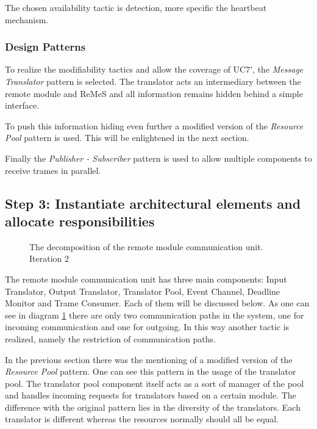 \npar The chosen availability tactic is detection, more specific the heartbeat
mechanism.

\subsubsection{Design Patterns}
\label{add:it2/patterns}

\npar To realize the modifiability tactics and allow the coverage of UC7', the
\emph{Message Translator} pattern is selected. The translator acts an
intermediary between the remote module and ReMeS and all information remains
hidden behind a simple interface. 

\npar To push this information hiding even further a modified version of the
\emph{Resource Pool} pattern is used. This will be enlightened in the next
section.

\npar Finally the \emph{Publisher - Subscriber} pattern is used to allow
multiple components to receive trames in parallel. 

\subsection{Step 3: Instantiate architectural elements and allocate responsibilities}
\label{add:it2/elements}

\begin{figure}[H]
	\begin{centering}
		\caption{The decomposition of the remote module communication unit. Iteration
		2}
		\label{fig:add/it2/decomposition}
	\end{centering}
\end{figure}

\npar The remote module communication unit has three main components: Input
Translator, Output Translator, Translator Pool, Event Channel, Deadline Monitor
and Trame Consumer. Each of them will be discussed below. As one can see in
diagram \ref{fig:add/it2/decomposition} there are only two communication paths
in the system, one for incoming communication and one for outgoing. In this way
another tactic is realized, namely the restriction of communication paths.

\npar In the previous section there was the mentioning of a modified version of
the \emph{Resource Pool} pattern. One can see this pattern in the usage of the
translator pool. The translator pool component itself acts as a sort of manager
of the pool and handles incoming requests for translators based on a
certain module. The difference with the original pattern lies in the 
diversity of the translators. Each translator is different whereas the
resources normally should all be equal. 

